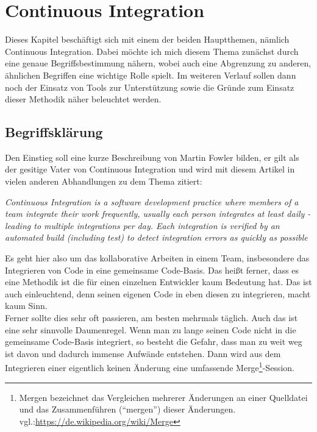 \pagebreak
\chapter{Continuous Integration}
Dieses Kapitel beschäftigt sich mit einem der beiden Hauptthemen, nämlich Continuous Integration. Dabei möchte ich mich diesem Thema zunächst durch eine genaue Begriffsbestimmung nähern, wobei auch eine Abgrenzung zu anderen, ähnlichen Begriffen eine wichtige Rolle spielt. Im weiteren Verlauf sollen dann noch der Einsatz von Tools zur Unterstützung sowie die Gründe zum Einsatz dieser Methodik näher beleuchtet werden.\\
\section{Begriffsklärung}
Den Einstieg soll eine kurze Beschreibung von Martin Fowler bilden, er gilt als der gesitige Vater von Continuous Integration und wird mit diesem Artikel in vielen anderen Abhandlungen zu dem Thema zitiert:
\begin{center}
	\textit{
	Continuous Integration is a software development practice where members of a team integrate their work frequently, usually each person integrates at least daily - leading to multiple integrations per day. Each integration is verified by an automated build (including test) to detect integration errors as quickly as possible} \cite{fowler-CI}
\end{center}
Es geht hier also um das kollaborative Arbeiten in einem Team, insbesondere das Integrieren von Code in eine gemeinsame Code-Basis. Das heißt ferner, dass es eine Methodik ist die für einen einzelnen Entwickler kaum Bedeutung hat. Das ist auch einleuchtend, denn seinen eigenen Code in eben diesen zu integrieren, macht kaum Sinn. \\
Ferner sollte dies sehr oft passieren, am besten mehrmals täglich. Auch das ist eine sehr sinnvolle Daumenregel. Wenn man zu lange seinen Code nicht in die gemeinsame Code-Basis integriert, so besteht die Gefahr, dass man zu weit weg ist davon und dadurch immense Aufwände entstehen. Dann wird aus dem Integrieren einer eigentlich keinen Änderung eine umfassende Merge\footnote{Mergen bezeichnet das Vergleichen mehrerer Änderungen an einer Quelldatei und das Zusammenführen ("`mergen"') dieser Änderungen. vgl.:\url{https://de.wikipedia.org/wiki/Merge}}-Session.\\
